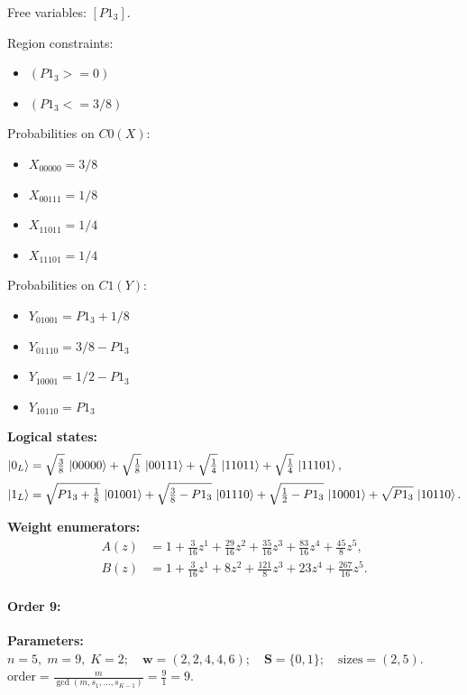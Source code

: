 \documentclass[11pt]{article}
\begin{document}
Free variables: $[P1_3]$.

Region constraints:
\begin{itemize}
    \item $(P1_3 >= 0)$
    \item $(P1_3 <= 3/8)$
\end{itemize}

Probabilities on $C0 (X)$:
\begin{itemize}
    \item $X_{00000} = 3/8$
    \item $X_{00111} = 1/8$
    \item $X_{11011} = 1/4$
    \item $X_{11101} = 1/4$
\end{itemize}

Probabilities on $C1 (Y)$:
\begin{itemize}
    \item $Y_{01001} = P1_3 + 1/8$
    \item $Y_{01110} = 3/8 - P1_3$
    \item $Y_{10001} = 1/2 - P1_3$
    \item $Y_{10110} = P1_3$
\end{itemize}

\noindent\textbf{Logical states:}
\begin{align*}
\ket{0_L} &= \sqrt{\tfrac{3}{8}}\,\ket{00000} + \sqrt{\tfrac{1}{8}}\,\ket{00111} + \sqrt{\tfrac{1}{4}}\,\ket{11011} + \sqrt{\tfrac{1}{4}}\,\ket{11101},
\\[2pt]
\ket{1_L} &= \sqrt{P1_3 + \tfrac{1}{8}}\,\ket{01001} + \sqrt{\tfrac{3}{8} - P1_3}\,\ket{01110} + \sqrt{\tfrac{1}{2} - P1_3}\,\ket{10001} + \sqrt{P1_3}\,\ket{10110}.
\end{align*}

\noindent\textbf{Weight enumerators:}
\begin{align*}
A(z) &= 1 + \tfrac{3}{16}z^{1} + \tfrac{29}{16}z^{2} + \tfrac{35}{16}z^{3} + \tfrac{83}{16}z^{4} + \tfrac{45}{8}z^{5},\\[2pt]
B(z) &= 1 + \tfrac{3}{16}z^{1} + 8z^{2} + \tfrac{121}{8}z^{3} + 23z^{4} + \tfrac{267}{16}z^{5}.
\end{align*}

\paragraph{\textbf{Order 9:}}
\noindent\textbf{Parameters:} $n=5,\; m=9,\; K=2;\quad \mathbf w=(2, 2, 4, 4, 6);\quad \mathbf S=\{0, 1\};\quad \text{sizes}=\left(2, 5\right).$ $\displaystyle \text{order}=\frac{m}{\gcd(m,s_1,\dots,s_{K-1})}=\frac{9}{1}=9.$
\end{document}
